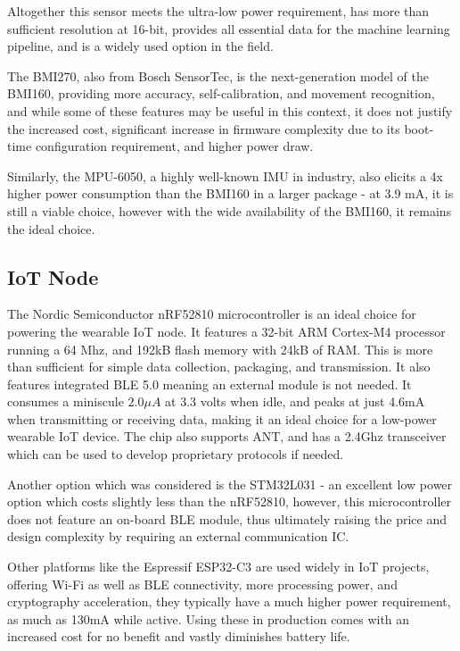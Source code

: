 \documentclass[conference]{IEEEtran}
\begin{document}
Altogether this sensor meets the ultra-low power requirement, has more than sufficient resolution at 16-bit, provides all essential data for the machine learning pipeline, and is a widely used option in the field.

The BMI270, also from Bosch SensorTec, is the next-generation model of the BMI160, providing more accuracy, self-calibration, and movement recognition, and while some of these features may be useful in this context, it does not justify the increased cost, significant increase in firmware complexity due to its boot-time configuration requirement, and higher power draw.

Similarly, the MPU-6050, a highly well-known IMU in industry, also elicits a 4x higher power consumption than the BMI160 in a larger package - at 3.9 mA, it is still a viable choice, however with the wide availability of the BMI160, it remains the ideal choice.

\subsection{IoT Node}
The Nordic Semiconductor nRF52810 microcontroller\cite{nRF52810} is an ideal choice for powering the wearable IoT node. It features a 32-bit ARM Cortex-M4 processor running a 64 Mhz, and 192kB flash memory with 24kB of RAM. This is more than sufficient for simple data collection, packaging, and transmission. It also features integrated BLE 5.0 meaning an external module is not needed. It consumes a miniscule $2.0\mu A$ at 3.3 volts when idle, and peaks at just 4.6mA when transmitting or receiving data, making it an ideal choice for a low-power wearable IoT device. The chip also supports ANT, and has a 2.4Ghz transceiver which can be used to develop proprietary protocols if needed.

Another option which was considered is the STM32L031 - an excellent low power option which costs slightly less than the nRF52810, however, this microcontroller does not feature an on-board BLE module, thus ultimately raising the price and design complexity by requiring an external communication IC. 

Other platforms like the Espressif ESP32-C3 are used widely in IoT projects, offering Wi-Fi as well as BLE connectivity, more processing power, and cryptography acceleration\cite{b8}, they typically have a much higher power requirement, as much as 130mA while active. Using these in production comes with an increased cost for no benefit and vastly diminishes battery life.
\end{document}
